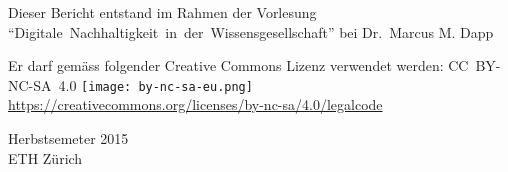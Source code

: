 \begin{titlepage}
\begin{large}
\begin{center}
			Dieser Bericht entstand im Rahmen der Vorlesung \mbox{``Digitale Nachhaltigkeit in der Wissensgesellschaft''} bei Dr.\ Marcus M. Dapp \\
			\vspace{2\baselineskip}
	
			Er darf gemäss folgender Creative Commons Lizenz verwendet werden: \mbox{CC BY-NC-SA 4.0} \texttt{[image: by-nc-sa-eu.png]}\\ \url{https://creativecommons.org/licenses/by-nc-sa/4.0/legalcode} \\
			\vfill
	
			Herbstsemeter 2015 \\
			\vspace{0.5\baselineskip}
			ETH Zürich
		\end{center}
	\end{large}
\end{titlepage}